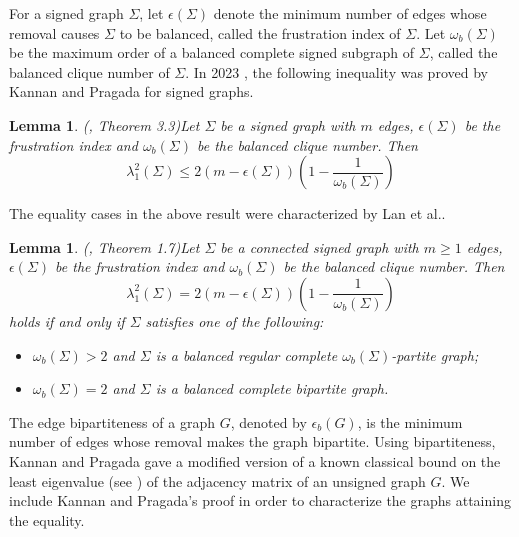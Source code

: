 \documentclass[12pt]{article}
\theoremstyle{plain}
\newtheorem{lemma}[theorem]{Lemma}
\numberwithin{equation}{section}
\begin{document}
	For a signed graph $\Sigma$, let $\epsilon(\Sigma)$ denote the minimum number of edges whose removal causes $\Sigma$ to be balanced, called the frustration index of $\Sigma$. Let $\omega_b(\Sigma)$ be the maximum order of a balanced complete signed subgraph of $\Sigma$, called the balanced clique number of $\Sigma$. In 2023 \cite{kannan2023signed}, the following inequality was proved by Kannan and Pragada for signed graphs.
	\begin{lemma} \emph{(\cite{kannan2023signed}, Theorem 3.3)}\label{KannanShiva_BoundThm}
		Let $\Sigma$ be a signed graph with $m$ edges, $\epsilon(\Sigma)$ be the frustration index and $\omega_b(\Sigma)$ be the balanced clique number. Then
		\begin{equation*}
			\lambda_1^2(\Sigma) \leq 2(m-\epsilon(\Sigma)) \left(1-\dfrac{1}{\omega_b(\Sigma)}\right)
		\end{equation*}
	\end{lemma}
	The equality cases in the above result were characterized by Lan et al..
	\begin{lemma}\emph{(\cite{lan2023remarks}, Theorem 1.7)}\label{KS_Bound_Equal}
		Let $\Sigma$ be a connected signed graph with $m \geq 1$ edges, $\epsilon(\Sigma)$ be the frustration index and $\omega_b(\Sigma)$ be the balanced clique number. Then
		\begin{equation}\label{KannanShiva_Bound}
			\lambda_1^2(\Sigma) = 2(m-\epsilon(\Sigma)) \left(1-\dfrac{1}{\omega_b(\Sigma)}\right)
		\end{equation}
		holds if and only if $\Sigma$ satisfies one of the following:
		\begin{itemize}
			
			
			\item $\omega_b(\Sigma)>2$ and 
			$\Sigma$ is a balanced regular complete $\omega_b(\Sigma)$-partite graph; 
			
			\item $\omega_b(\Sigma)=2$ and
			$\Sigma$ is a balanced complete bipartite graph.
		\end{itemize}
	\end{lemma}
	The edge bipartiteness of a graph $G$, denoted by $\epsilon_b(G)$, is the minimum number of edges whose removal makes the graph bipartite. Using bipartiteness, Kannan and Pragada gave a modified version of a known classical bound on the least eigenvalue (see \cite{favaron1993some}) of the adjacency matrix of an unsigned graph $G$. We include Kannan and Pragada's proof in order to characterize the graphs attaining the equality.
	
\end{document}
